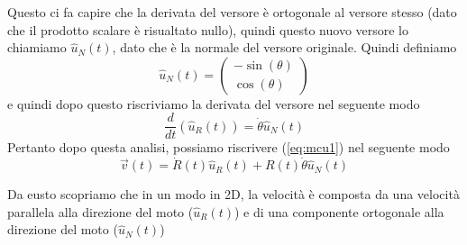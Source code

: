 \documentclass{rapport}
\begin{document}
Questo ci fa capire che la derivata del versore è ortogonale al versore stesso (dato che il prodotto scalare è risualtato nullo), quindi questo nuovo versore lo chiamiamo $\hat{u}_N(t)$, dato che è la normale del versore originale. Quindi definiamo 
\[
\hat{u}_N(t) = \begin{pmatrix}
  -\sin(\theta)\\
\cos(\theta)
\end{pmatrix}
\]
e quindi dopo questo riscriviamo la derivata del versore nel seguente modo 
\[
\dfrac{d}{dt}\left(\hat{u}_R(t)\right) = \dot{\theta} \hat{u}_N(t)
\]
Pertanto dopo questa analisi, possiamo riscrivere (\ref{eq:mcu1}) nel seguente modo
\[
\vec{v}(t) =  \dot{R}(t) \hat{u}_R(t) +  R(t) \dot{\theta} \hat{u}_N(t)
\] 

Da eusto scopriamo che in un modo in 2D, la velocità è composta da una velocità parallela alla direzione del moto ($\hat{u}_R(t)$) e di una componente ortogonale alla direzione del moto ($\hat{u}_N(t)$)
\end{document}

